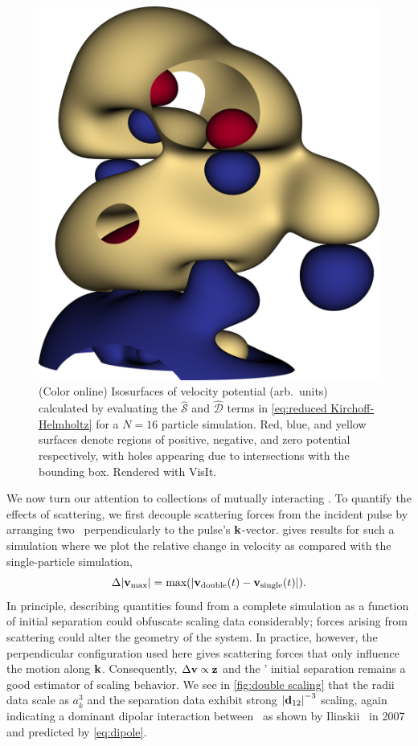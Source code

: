 \begin{figure}
  \centering
  \includegraphics[width=0.5\columnwidth]{figures/3d_isosurface.png}
  \caption{
    \label{fig:isosurface}(Color online) 
    Isosurfaces of velocity potential (arb.~units) calculated by evaluating the $\hat{\mathcal{S}}$ and $\hat{\mathcal{D}}$ terms in \cref{eq:reduced Kirchoff-Helmholtz} for a $N = 16$ particle simulation.
    Red, blue, and yellow surfaces denote regions of positive, negative, and zero potential respectively, with holes appearing due to intersections with the bounding box.
    Rendered with VisIt\cite{VisIt}.
  }
\end{figure}
We now turn our attention to collections of mutually interacting \bubbles.
To quantify the effects of scattering, we first decouple scattering forces from the incident pulse by arranging two \bubbles\ perpendicularly to the pulse's $\vb{k}$-vector.
 gives results for such a simulation where we plot the relative change in velocity as compared with the single-particle simulation,
\begin{equation}
  \Delta \abs{\vb{v}_\text{max}} = \text{max}\qty(\abs{\vb{v}_\text{double}(t) - \vb{v}_\text{single}(t)}).
\end{equation}
In principle, describing quantities found from a complete simulation as a function of initial separation could obfuscate scaling data considerably; forces arising from scattering could alter the geometry of the system.
In practice, however, the perpendicular configuration used here gives scattering forces that only influence the motion along $\vb{k}$.
Consequently, $\Delta\vb{v} \propto \vb{z}$ and the \bubbles' initial separation remains a good estimator of scaling behavior. 
We see in \cref{fig:double scaling} that the radii data scale as $a_k^3$ and the
separation data exhibit strong $\abs{\vb{d}_{12}}^{-3}$ scaling, again
indicating a dominant dipolar interaction between \bubbles\ as shown by Ilinskii \etal\ in 2007~\cite{Ilinskii2007} and predicted by \cref{eq:dipole}.

